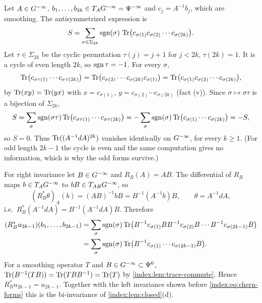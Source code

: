 \subsection*{}
Let $A\in G^{-\infty}$, $b_1,\dots,b_{2k}\in T_AG^{-\infty}=\Psi^{-\infty}$ and $c_j=A^{-1}b_j$,
which are smoothing. The antisymmetrized expression is
\begin{equation*}
  S=\sum_{\sigma\in\Sigma_{2k}}\operatorname{sgn}(\sigma)\,\operatorname{Tr}\bigl(c_{\sigma(1)}c_{\sigma(2)}\cdots
  c_{\sigma(2k)}\bigr).
\end{equation*}
Let $\tau\in\Sigma_{2k}$ be the cyclic permutation $\tau(j)=j+1$ for $j<2k$,
$\tau(2k)=1$. It is a cycle of even length $2k$, so $\operatorname{sgn}\tau=-1$. For every $\sigma$,
\begin{equation*}
  \operatorname{Tr}\bigl(c_{\sigma\tau(1)}\cdots c_{\sigma\tau(2k)}\bigr)
  =\operatorname{Tr}\bigl(c_{\sigma(2)}\cdots c_{\sigma(2k)}c_{\sigma(1)}\bigr)
  =\operatorname{Tr}\bigl(c_{\sigma(1)}c_{\sigma(2)}\cdots c_{\sigma(2k)}\bigr),
\end{equation*}
by $\operatorname{Tr}(xy)=\operatorname{Tr}(yx)$ with $x=c_{\sigma(1)}$, $y=c_{\sigma(2)}\cdots c_{\sigma(2k)}$
(fact (v)). Since $\sigma\mapsto\sigma\tau$ is a bijection of $\Sigma_{2k}$,
\begin{equation*}
  S=\sum_\sigma\operatorname{sgn}(\sigma\tau)\operatorname{Tr}\bigl(c_{\sigma\tau(1)}\cdots c_{\sigma\tau(2k)}\bigr)
  =-\sum_\sigma\operatorname{sgn}(\sigma)\operatorname{Tr}\bigl(c_{\sigma(1)}\cdots c_{\sigma(2k)}\bigr)=-S ,
\end{equation*}
so $S=0$. Thus $\operatorname{Tr}((A^{-1}dA)^{2k})$ vanishes identically on $G^{-\infty}$, for every
$k\ge1$. (For odd length $2k-1$ the cycle is even and the same computation gives no
information, which is why the odd forms survive.)

For right invariance let $B\in G^{-\infty}$ and $R_B(A)=AB$. The differential of $R_B$ maps
$b\in T_AG^{-\infty}$ to $bB\in T_{AB}G^{-\infty}$, so
\begin{equation*}
  (R_B^*\theta)_A(b)=(AB)^{-1}bB=B^{-1}(A^{-1}b)B,\qquad \theta=A^{-1}dA,
\end{equation*}
i.e.\ $R_B^*(A^{-1}dA)=B^{-1}(A^{-1}dA)B$. Therefore
\begin{align*}
  (R_B^*u_{2k-1})(b_1,\dots,b_{2k-1})&=\sum_\sigma\operatorname{sgn}(\sigma)\operatorname{Tr}\bigl(B^{-1}c_{\sigma(1)}
  BB^{-1}c_{\sigma(2)}B\cdots B^{-1}c_{\sigma(2k-1)}B\bigr)\\
  &=\sum_\sigma\operatorname{sgn}(\sigma)\operatorname{Tr}\bigl(B^{-1}c_{\sigma(1)}\cdots c_{\sigma(2k-1)}B\bigr).
\end{align*}
For a smoothing operator $T$ and $B\in G^{-\infty}\subset\Psi^{0}$,
$\operatorname{Tr}(B^{-1}(TB))=\operatorname{Tr}(TBB^{-1})=\operatorname{Tr}(T)$ by \cref{index:lem:trace-commute}. Hence
$R_B^*u_{2k-1}=u_{2k-1}$. Together with the left invariance shown before
\eqref{index:eq:chern-forms} this is the bi-invariance of
\cref{index:lem:closed}(d).

